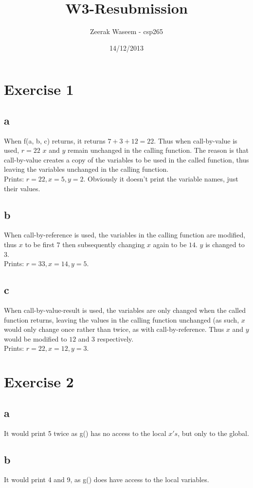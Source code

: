 \documentclass{article}
\title{W3-Resubmission}
\author{Zeerak Waseem - csp265}
\date{14/12/2013}
\begin{document}
\maketitle
\newpage

\section{Exercise 1}

\subsection{a}
When f(a, b, c) returns, it returns \(7 + 3 + 12 = 22\). Thus when call-by-value is used, \(r = 22\) \(x\) and \(y\) remain unchanged in the calling function. The reason is that call-by-value creates a copy of the variables to be used in the called function, thus leaving the variables unchanged in the calling function.\\
Prints: \(r=22, x = 5, y = 2\). Obviously it doesn't print the variable names, just their values.
\subsection{b}
When call-by-reference is used, the variables in the calling function are modified, thus \(x\) to be first \(7\) then subsequently changing \(x\) again to be \(14\). \(y\) is changed to \(3\).\\
Prints: \(r = 33, x = 14, y = 5\).
\subsection{c}
When call-by-value-result is used, the variables are only changed when the called function returns, leaving the values in the calling function unchanged (as such, \(x\) would only change once rather than twice, as with call-by-reference. Thus \(x\) and \(y\) would be modified to \(12\) and \(3\) respectively.\\
Prints: \(r = 22, x = 12, y = 3\).
\section{Exercise 2}
\subsection{a}
It would print 5 twice as g() has no access to the local \(x's\), but only to the global.
\subsection{b}
It would print 4 and 9, as g() does have access to the local variables.
\end{document}
